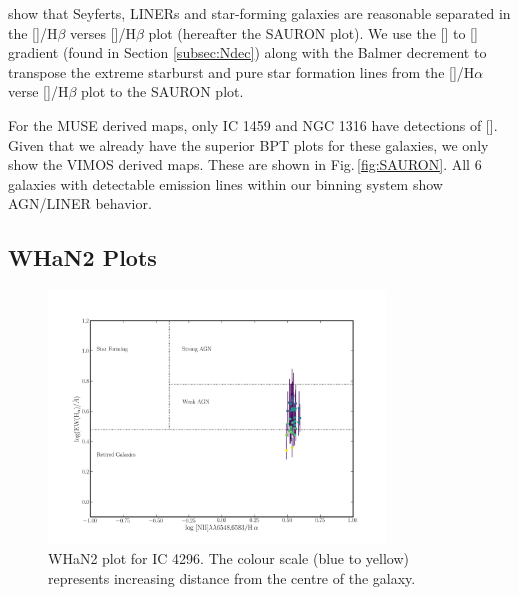 		\citet{Sarzi2010} show that Seyferts, LINERs and star-forming galaxies are reasonable separated in the []/H$\beta$ verses []/H$\beta$ plot (hereafter the SAURON plot). We use the [] to [] gradient (found in Section \ref{subsec:Ndec}) along with the Balmer decrement to transpose the \citet{Kewley2001} extreme starburst and \citet{Kauffmann2003a} pure star formation lines from the []/H$\alpha$ verse []/H$\beta$ plot to the SAURON plot.

		For the MUSE derived maps, only IC 1459 and NGC 1316 have detections of []. Given that we already have the superior BPT plots for these galaxies, we only show the VIMOS derived maps. These are shown in Fig.\,\ref{fig:SAURON}. All 6 galaxies with detectable emission lines within our binning system show AGN/LINER behavior.

		


	\subsection{WHaN2 Plots}
		\label{subsec:WHaN2}
		\begin{figure}
			\centering
			\includegraphics[width=0.8\textwidth]{chapter5/WHaN2.png}
			\caption[WHaN2 plot for IC 4296]{WHaN2 plot for IC 4296. The colour scale (blue to yellow) represents increasing distance from the centre of the galaxy.}
			\label{fig:WHaN2}
		\end{figure}

